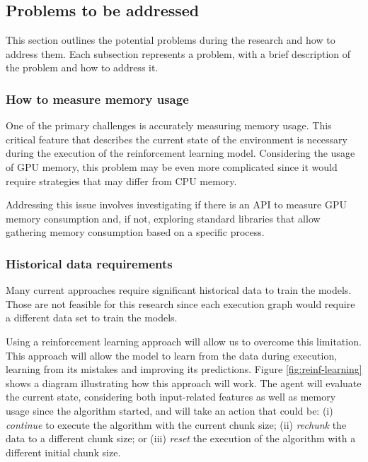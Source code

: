 \subsection{Problems to be addressed}
\label{subsec:problems-to-be-addressed}

This section outlines the potential problems during the research and how to address them.
Each subsection represents a problem, with a brief description of the problem and how to address it.

\subsubsection{How to measure memory usage}

One of the primary challenges is accurately measuring memory usage.
This critical feature that describes the current state of the environment is necessary during the execution of the reinforcement learning model.
Considering the usage of \ac{GPU} memory, this problem may be even more complicated since it would require strategies that may differ from \ac{CPU} memory.

Addressing this issue involves investigating if there is an API to measure \ac{GPU} memory consumption and, if not, exploring standard libraries that allow gathering memory consumption based on a specific process.

\subsubsection{Historical data requirements}

Many current approaches require significant historical data to train the models.
Those are not feasible for this research since each execution graph would require a different data set to train the models.

Using a reinforcement learning approach will allow us to overcome this limitation.
This approach will allow the model to learn from the data during execution, learning from its mistakes and improving its predictions.
Figure \ref{fig:reinf-learning} shows a diagram illustrating how this approach will work.
The agent will evaluate the current state, considering both input-related features as well as memory usage since the algorithm started, and will take an action that could be:
(i) \textit{continue} to execute the algorithm with the current chunk size;
(ii) \textit{rechunk} the data to a different chunk size;
or (iii) \textit{reset} the execution of the algorithm with a different initial chunk size.

